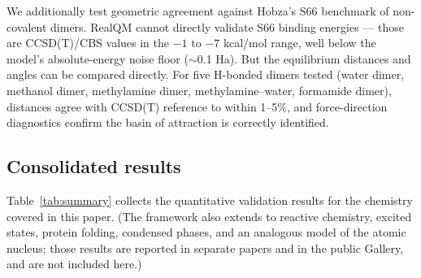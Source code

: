 \documentclass[11pt]{article}
\begin{document}
We additionally test geometric agreement against Hobza's S66 benchmark of non-covalent dimers. RealQM cannot directly validate S66 binding energies --- those are CCSD(T)/CBS values in the $-1$ to $-7$ kcal/mol range, well below the model's absolute-energy noise floor ($\sim$0.1 Ha). But the equilibrium distances and angles can be compared directly. For five H-bonded dimers tested (water dimer, methanol dimer, methylamine dimer, methylamine--water, formamide dimer), distances agree with CCSD(T) reference to within 1--5\%, and force-direction diagnostics confirm the basin of attraction is correctly identified.

\subsection{Consolidated results}\label{sec:summary}

Table~\ref{tab:summary} collects the quantitative validation results for the chemistry covered in this paper. (The framework also extends to reactive chemistry, excited states, protein folding, condensed phases, and an analogous model of the atomic nucleus; those results are reported in separate papers and in the public Gallery, and are not included here.)
\end{document}
